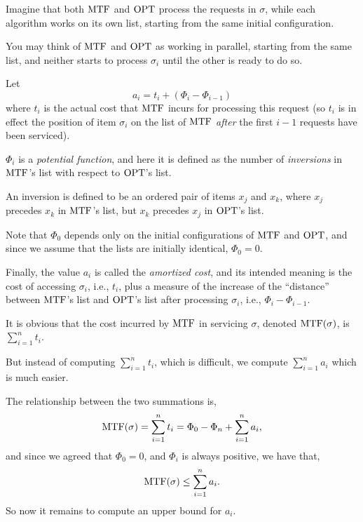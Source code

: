 \begin{frame}
Imagine that both $\mathrm{MTF}$ and $\mathrm{OPT}$ process the requests in $\sigma$,
while each algorithm works on its own list, starting from the same
initial configuration.  

You may think of $\mathrm{MTF}$ and $\mathrm{OPT}$ as working
in parallel, starting from the same list, and neither starts to
process $\sigma_i$ until the other is ready to do so.
\end{frame}

\begin{frame}
Let 
$$
a_i=t_i+(\Phi_i-\Phi_{i-1})
$$
where $t_i$ is the actual cost that $\mathrm{MTF}$ incurs for processing this
request (so $t_i$ is in effect the position of item $\sigma_i$ on the
list of $\mathrm{MTF}$ {\em after} the first $i-1$ requests have been
serviced).  

$\Phi_i$ is a {\em potential function}, and here it is
defined as the number of {\em inversions} in $\mathrm{MTF}$'s list with respect
to $\mathrm{OPT}$'s list.  

An inversion is defined to be an
ordered pair of items $x_j$ and $x_k$, where $x_j$ precedes $x_k$ in
$\mathrm{MTF}$'s list, but $x_k$ precedes $x_j$ in $\mathrm{OPT}$'s list.  
\end{frame}

\begin{frame}
Note that $\Phi_0$ depends only on the initial configurations of
$\mathrm{MTF}$
and $\mathrm{OPT}$, and since we assume that the lists are initially identical,
$\Phi_0=0$.  

Finally, the value $a_i$ is called
the {\em amortized cost}, and its intended
meaning is the cost of accessing $\sigma_i$, i.e., $t_i$, plus a
measure of the increase of
the ``distance'' between $\mathrm{MTF}$'s list and $\mathrm{OPT}$'s list after processing
$\sigma_i$, i.e., $\Phi_i-\Phi_{i-1}$.
\end{frame}

\begin{frame}
It is obvious that the cost incurred by $\mathrm{MTF}$ in servicing $\sigma$,
denoted $\mathrm{MTF}(\sigma)$, is $\sum_{i=1}^nt_i$.  

But instead of
computing $\sum_{i=1}^nt_i$, which is difficult, we compute
$\sum_{i=1}^na_i$ which is much easier.  

The relationship between the
two summations is,
$$
\mathrm{MTF}(\sigma)=\sum_{i=1}^nt_i=\Phi_0-\Phi_n+\sum_{i=1}^na_i,
$$
and since we agreed that $\Phi_0=0$, and $\Phi_i$ is always positive,
we have that,
$$
\mathrm{MTF}(\sigma)\le\sum_{i=1}^na_i.
$$
So now it remains to compute an upper bound for $a_i$.
\end{frame}

